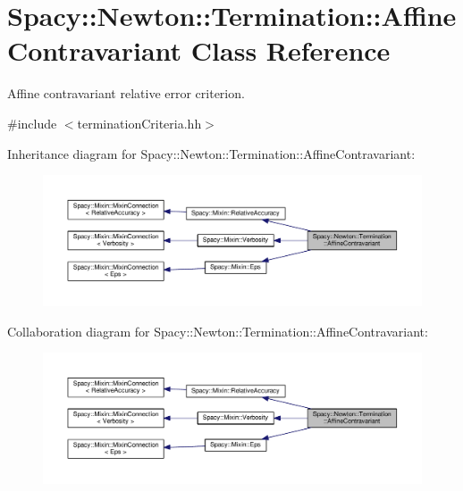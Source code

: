 \hypertarget{classSpacy_1_1Newton_1_1Termination_1_1AffineContravariant}{}\section{Spacy\+:\+:Newton\+:\+:Termination\+:\+:Affine\+Contravariant Class Reference}
\label{classSpacy_1_1Newton_1_1Termination_1_1AffineContravariant}


Affine contravariant relative error criterion.  




{\ttfamily \#include $<$termination\+Criteria.\+hh$>$}



Inheritance diagram for Spacy\+:\+:Newton\+:\+:Termination\+:\+:Affine\+Contravariant\+:\nopagebreak
\begin{figure}[H]
\begin{center}
\leavevmode
\includegraphics[width=350pt]{classSpacy_1_1Newton_1_1Termination_1_1AffineContravariant__inherit__graph}
\end{center}
\end{figure}


Collaboration diagram for Spacy\+:\+:Newton\+:\+:Termination\+:\+:Affine\+Contravariant\+:\nopagebreak
\begin{figure}[H]
\begin{center}
\leavevmode
\includegraphics[width=350pt]{classSpacy_1_1Newton_1_1Termination_1_1AffineContravariant__coll__graph}
\end{center}
\end{figure}
